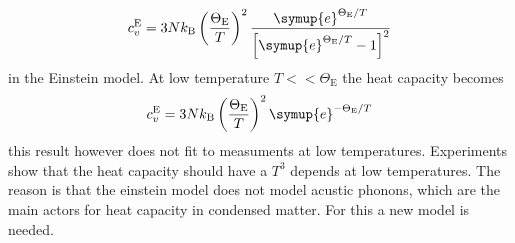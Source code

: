 \begin{equation*}
    c_v ^{\text{E}} = 3 N k_\text{B} \left ( \frac{\Theta_\text{E}}{T} \right )^2 \frac{ \symup{e}^{\Theta_\text{E}/T}}{\left [ \symup{e}^{\Theta_\text{E}/T} - 1 \right ]^2}
    \label{eq:heat_einstein}
\end{equation*}
in the Einstein model.
At low temperature $T<<\Theta_\text{E}$ the heat capacity becomes 
\begin{equation*}
    c_v ^{\text{E}} = 3Nk_\text{B} \left ( \frac{\Theta_\text{E}}{T} \right )^2 \symup{e}^{-\Theta_\text{E}/T}
\end{equation*}
this result however does not fit to measuments at low temperatures.
Experiments show that the heat capacity should have a $T^3$ depends at low temperatures.
The reason is that the einstein model does not model acustic phonons, which are the main actors for heat capacity in condensed matter.
For this a new model is needed.
